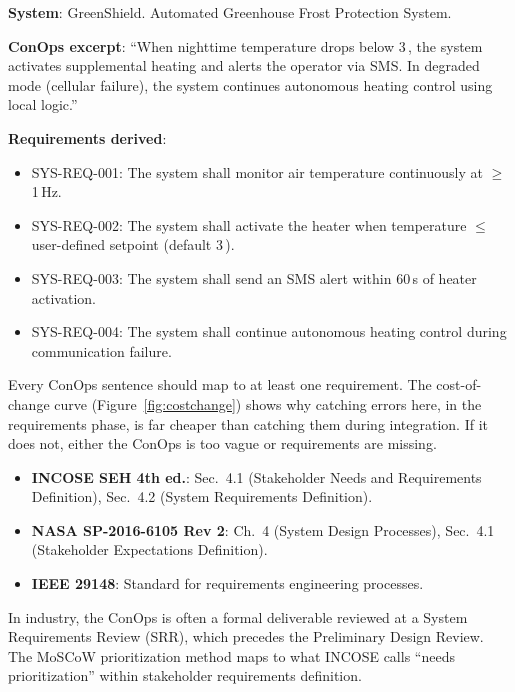 \begin{greenshieldbox}
\textbf{System}: GreenShield. Automated Greenhouse Frost Protection System.

\textbf{ConOps excerpt}: ``When nighttime temperature drops below 3\,\degC{}, the system activates supplemental heating and alerts the operator via SMS. In degraded mode (cellular failure), the system continues autonomous heating control using local logic.''

\textbf{Requirements derived}:
\begin{itemize}[nosep,leftmargin=1.5em]
\item SYS-REQ-001: The system shall monitor air temperature continuously at $\geq$1\,Hz.
\item SYS-REQ-002: The system shall activate the heater when temperature $\leq$ user-defined setpoint (default 3\,\degC{}).
\item SYS-REQ-003: The system shall send an SMS alert within 60\,s of heater activation.
\item SYS-REQ-004: The system shall continue autonomous heating control during communication failure.
\end{itemize}
Every ConOps sentence should map to at least one requirement. The cost-of-change curve (Figure~\ref{fig:costchange}) shows why catching errors here, in the requirements phase, is far cheaper than catching them during integration. If it does not, either the ConOps is too vague or requirements are missing.
\end{greenshieldbox}

\begin{keyconceptbox}
\begin{itemize}[nosep,leftmargin=1.5em]
\item \textbf{INCOSE SEH 4th ed.}: Sec.\ 4.1 (Stakeholder Needs and Requirements Definition), Sec.\ 4.2 (System Requirements Definition).
\item \textbf{NASA SP-2016-6105 Rev 2}: Ch.\ 4 (System Design Processes), Sec.\ 4.1 (Stakeholder Expectations Definition).
\item \textbf{IEEE 29148}: Standard for requirements engineering processes.
\end{itemize}
In industry, the ConOps is often a formal deliverable reviewed at a System Requirements Review (SRR), which precedes the Preliminary Design Review. The MoSCoW prioritization method maps to what INCOSE calls ``needs prioritization'' within stakeholder requirements definition.
\end{keyconceptbox}

